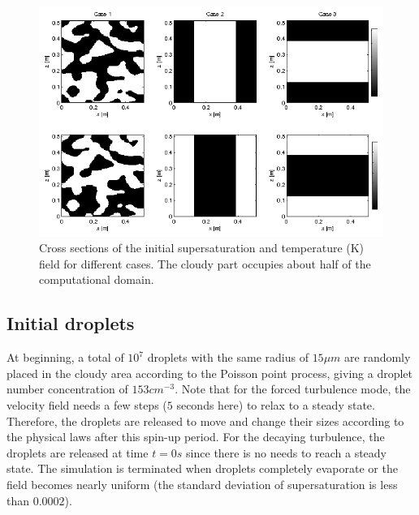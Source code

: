 \documentclass[draft,linenumbers]{agujournal}
\begin{document}
\begin{figure}\centering
\includegraphics[width=0.9\linewidth]{Figures/init_vapor_supersat}
\caption{Cross sections of the initial supersaturation and temperature (K) field for different cases. The cloudy part occupies about half of the computational domain.\label{fig:slice_case123}}
\end{figure}

\subsection{Initial droplets}

At beginning, a total of $10^{7}$ droplets with the same radius of $15\mu m$ are randomly placed in the cloudy area according to the Poisson point process, giving a droplet number concentration of $153{cm}^{-3}$. Note that for the forced turbulence mode, the velocity field needs a few steps ($5$ seconds here) to relax to a steady state. Therefore, the droplets are released to move and change their sizes according to the physical laws after this spin-up period. For the decaying turbulence, the droplets are released at time $t = 0s$ since there is no needs to reach a steady state. The simulation is terminated when droplets completely evaporate or the field becomes nearly uniform (the standard deviation of supersaturation is less than $0.0002$). 
\end{document}
